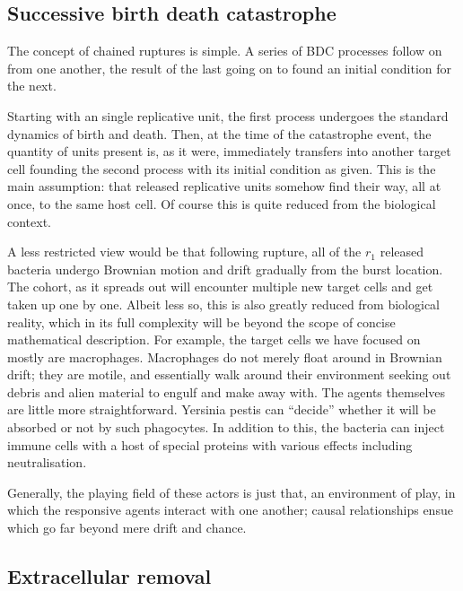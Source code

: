 \subsection{Successive birth death catastrophe}
\noindent
The concept of chained ruptures is simple. A series of BDC processes follow on from one another, the result of the last going on to found an initial condition for the next.\par
Starting with an single replicative unit, the first process undergoes the standard dynamics of birth and death. Then, at the time of the catastrophe event, the quantity of units present is, as it were, immediately transfers into another target cell founding the second process with its initial condition as given. This is the main assumption: that released replicative units somehow find their way, all at once, to the same host cell. Of course this is quite reduced from the biological context.\par
A less restricted view would be that following rupture, all of the $r_1$ released bacteria undergo Brownian motion and drift gradually from the burst location. The cohort, as it spreads out will encounter multiple new target cells and get taken up one by one. Albeit less so, this is also greatly reduced from biological reality, which in its full complexity will be beyond the scope of concise mathematical description. For example, the target cells we have focused on mostly are macrophages. Macrophages do not merely float around in Brownian drift; they are motile, and essentially walk around their environment seeking out debris and alien material to engulf and make away with. The agents themselves are little more straightforward. Yersinia pestis can ``decide'' whether it will be absorbed or not by such phagocytes. In addition to this, the bacteria can inject immune cells with a host of special proteins with various effects including neutralisation.\par
Generally, the playing field of these actors is just that, an environment of play, in which the responsive agents interact with one another; causal relationships ensue which go far beyond mere drift and chance.\par

\subsection{Extracellular removal}



